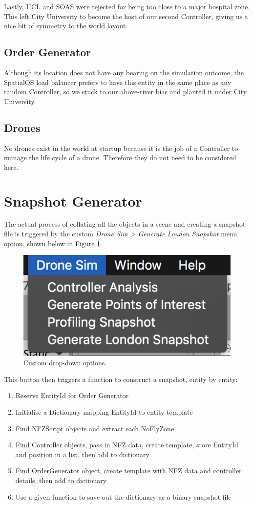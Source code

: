\documentclass[a4paper,11pt,titlepage]{report}
\begin{document}
Lastly, UCL and SOAS were rejected for being too close to a major hospital zone. This left City University to become the host of our second Controller, giving us a nice bit of symmetry to the world layout.

\subsection{Order Generator}
Although its location does not have any bearing on the simulation outcome, the SpatialOS load balancer prefers to have this entity in the same place as any random Controller, so we stuck to our above-river bias and planted it under City University.

\subsection{Drones}
No drones exist in the world at startup because it is the job of a Controller to manage the life cycle of a drone. Therefore they do not need to be considered here.

\section{Snapshot Generator}
The actual process of collating all the objects in a scene and creating a snapshot file is triggered by the custom \textit{Drone Sim > Generate London Snapshot} menu option, shown below in Figure \ref{fig:menuotions}.

\begin{figure}[!hbpt]
  \center
  \includegraphics[width=0.5\linewidth]{img/menuotions.png}
  \caption{Custom drop-down options.}
  \label{fig:menuotions}
\end{figure}

This button then triggers a function to construct a snapshot, entity by entity:
\begin{enumerate}
  \item Reserve EntityId for Order Generator
  \item Initialise a Dictionary mapping EntityId to entity template
  \item Find NFZScript objects and extract each NoFlyZone
  \item Find Controller objects, pass in NFZ data, create template, store EntityId and position in a list, then add to dictionary
  \item Find OrderGenerator object, create template with NFZ data and controller details, then add to dictionary
  \item Use a given function to save out the dictionary as a binary snapshot file
\end{enumerate}
\end{document}
